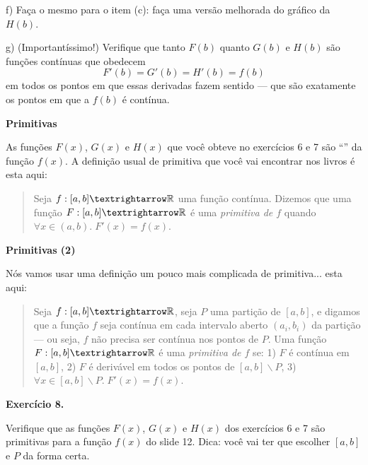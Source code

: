\documentclass[oneside,12pt]{article}
\begin{document}
f) Faça o mesmo para o item (c): faça uma versão melhorada do gráfico
da $H(b)$.

\msk

g) (Importantíssimo!) Verifique que tanto $F(b)$ quanto $G(b)$ e
$H(b)$ são funções contínuas que obedecem
%
$$F'(b) = G'(b) = H'(b) = f(b)$$
%
em todos os pontos em que essas derivadas fazem sentido --- que são
exatamente os pontos em que a $f(b)$ é contínua.

\newpage

{\bf Primitivas}

\ssk

As funções $F(x)$, $G(x)$ e $H(x)$ que você obteve no exercícios 6 e 7
são ``'' da função $f(x)$. A definição usual de
primitiva que você vai encontrar nos livros é esta aqui:

\begin{quote}
Seja $f:[a,b]→\R$ uma função contínua. Dizemos que uma função
$F:[a,b]→\R$ é uma {\sl primitiva de $f$} quando
$∀x∈(a,b).\;F'(x)=f(x)$.
\end{quote}

\newpage

{\bf Primitivas (2)}

\ssk

Nós vamos usar uma definição um pouco mais complicada de primitiva...
esta aqui:

\begin{quote}
Seja $f:[a,b]→\R$, seja $P$ uma partição de $[a,b]$, e digamos que a
função $f$ seja contínua em cada intervalo aberto $(a_i,b_i)$ da
partição --- ou seja, $f$ não precisa ser contínua nos pontos de $P$.
Uma função $F:[a,b]→\R$ é uma {\sl primitiva de $f$} se: 1) $F$ é
contínua em $[a,b]$, 2) $F$ é derivável em todos os pontos de
$[a,b]∖P$, 3) $∀x∈[a,b]∖P. \; F'(x)=f(x)$.
\end{quote}

\msk


{\bf Exercício 8.}

Verifique que as funções $F(x)$, $G(x)$ e $H(x)$ dos exercícios 6 e 7
são primitivas para a função $f(x)$ do slide 12. Dica: você vai ter
que escolher $[a,b]$ e $P$ da forma certa.

\newpage


\end{document}
